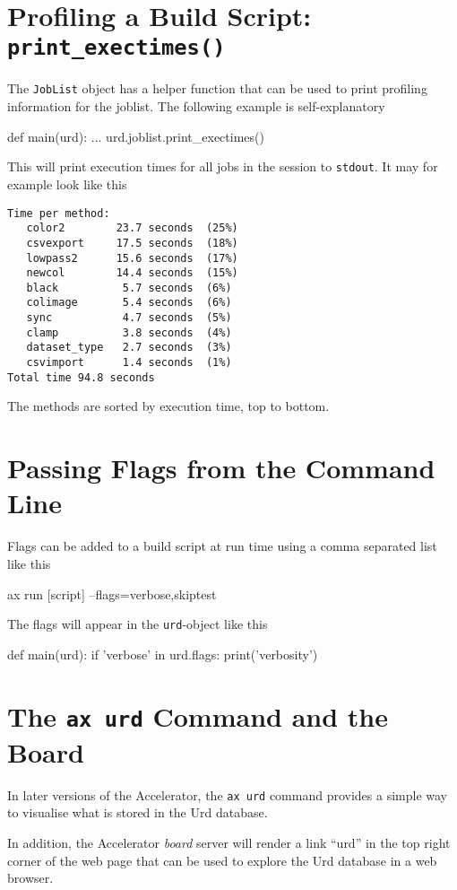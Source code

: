 \section{Profiling a Build Script:  \texttt{print\_exectimes()}}
The \texttt{JobList} object has a helper function that can be used to
print profiling information for the joblist.  The following example is
self-explanatory
\begin{python}
def main(urd):
    ...
    urd.joblist.print_exectimes()
\end{python}
This will print execution times for all jobs in the session
to \texttt{stdout}.  It may for example look like this
\begin{verbatim}
Time per method:
   color2        23.7 seconds  (25%)
   csvexport     17.5 seconds  (18%)
   lowpass2      15.6 seconds  (17%)
   newcol        14.4 seconds  (15%)
   black          5.7 seconds  (6%)
   colimage       5.4 seconds  (6%)
   sync           4.7 seconds  (5%)
   clamp          3.8 seconds  (4%)
   dataset_type   2.7 seconds  (3%)
   csvimport      1.4 seconds  (1%)
Total time 94.8 seconds
\end{verbatim}
The methods are sorted by execution time, top to bottom.





\section{Passing Flags from the Command Line}
Flags can be added to a build script at run time using a comma
separated list like this
\begin{python}
ax run [script] --flags=verbose,skiptest
\end{python}
The flags will appear in the \texttt{urd}-object like this
\begin{python}
def main(urd):
    if 'verbose' in urd.flags:
        print('verbosity')
\end{python}





\section{The \texttt{ax urd} Command and the Board}
In later versions of the Accelerator, the \texttt{ax urd} command
provides a simple way to visualise what is stored in the Urd database.

In addition, the Accelerator \textsl{board} server will render a link
``urd'' in the top right corner of the web page that can be used to
explore the Urd database in a web browser.

